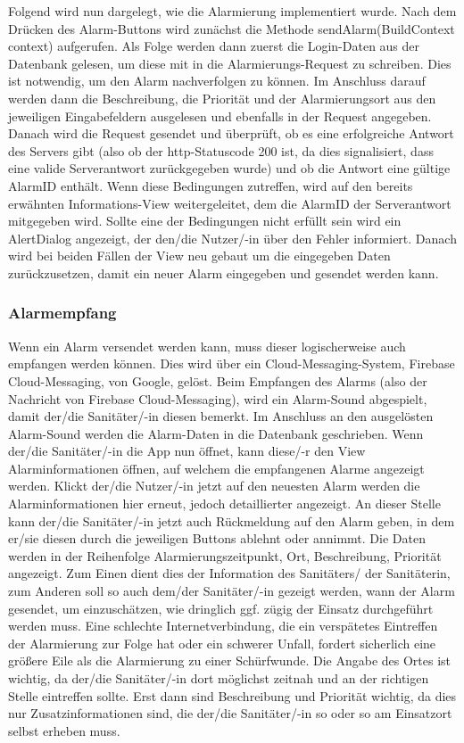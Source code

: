     Folgend wird nun dargelegt, wie die Alarmierung implementiert wurde.
    Nach dem Drücken des Alarm-Buttons wird zunächst die Methode sendAlarm(BuildContext context)
    aufgerufen. Als Folge werden dann zuerst die Login-Daten aus der Datenbank gelesen, 
    um diese mit in die Alarmierungs-Request zu schreiben. Dies ist notwendig, um den Alarm nachverfolgen zu können.
    Im Anschluss darauf werden dann die 
    Beschreibung, die Priorität und der Alarmierungsort aus den jeweiligen Eingabefeldern 
    ausgelesen und ebenfalls in der Request angegeben. Danach wird die Request gesendet und 
    überprüft, ob es eine erfolgreiche Antwort des Servers gibt (also ob der http-Statuscode 
    200 ist, da dies signalisiert, dass eine valide Serverantwort zurückgegeben wurde) und ob die Antwort 
    eine gültige AlarmID enthält. Wenn diese Bedingungen zutreffen, 
    wird auf den bereits erwähnten Informations-View weitergeleitet, dem die AlarmID der 
    Serverantwort mitgegeben wird. Sollte eine der Bedingungen nicht erfüllt sein wird 
    ein AlertDialog angezeigt, der den/die Nutzer/-in über den Fehler informiert. Danach wird 
    bei beiden Fällen der View neu gebaut um die eingegeben Daten zurückzusetzen, damit ein neuer Alarm eingegeben 
    und gesendet werden kann.

\subsubsection{Alarmempfang}
    Wenn ein Alarm versendet werden kann, muss dieser logischerweise auch empfangen 
    werden können. Dies wird über ein Cloud-Messaging-System, Firebase 
    Cloud-Messaging, von Google, gelöst. Beim Empfangen des Alarms (also der 
    Nachricht von Firebase Cloud-Messaging), wird ein Alarm-Sound abgespielt, damit 
    der/die Sanitäter/-in diesen bemerkt. Im Anschluss an den ausgelösten Alarm-Sound werden die Alarm-Daten
    in die Datenbank geschrieben. Wenn der/die Sanitäter/-in die App nun öffnet, kann
    diese/-r den View \glqq Alarminformationen\grqq{} öffnen, auf welchem die empfangenen
    Alarme angezeigt werden. Klickt der/die Nutzer/-in jetzt auf den neuesten Alarm 
    werden die Alarminformationen hier erneut, jedoch detaillierter angezeigt.
    An dieser Stelle kann der/die Sanitäter/-in jetzt auch Rückmeldung auf den Alarm geben, in 
    dem er/sie diesen durch die jeweiligen Buttons ablehnt oder annimmt.
    Die Daten werden in der Reihenfolge Alarmierungszeitpunkt, Ort, Beschreibung, 
    Priorität angezeigt. Zum Einen dient dies der Information des 
    Sanitäters/ der Sanitäterin, zum Anderen soll so auch dem/der Sanitäter/-in 
    gezeigt werden, wann der Alarm gesendet, um einzuschätzen, wie dringlich ggf. zügig der Einsatz durchgeführt
    werden muss. Eine schlechte Internetverbindung, die ein verspätetes Eintreffen der Alarmierung zur Folge hat 
    oder ein schwerer Unfall, fordert sicherlich eine größere Eile als die Alarmierung zu einer Schürfwunde.
    Die Angabe des Ortes ist wichtig, da 
    der/die Sanitäter/-in dort möglichst zeitnah und an der richtigen Stelle eintreffen sollte. Erst dann 
    sind Beschreibung und Priorität wichtig, da dies nur Zusatzinformationen sind, 
    die der/die Sanitäter/-in so oder so am Einsatzort selbst erheben muss.

